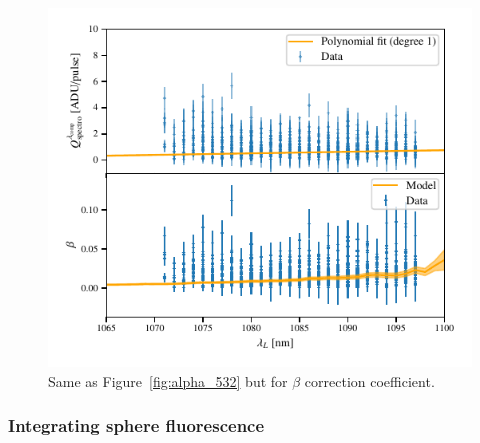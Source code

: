 \begin{figure}[h]
    \centering
    \includegraphics[width=\columnwidth]{fig/beta_532_qswMAX.pdf}
    \caption{Same as Figure~\ref{fig:alpha_532} but for $\beta$ correction coefficient.}
    \label{fig:beta}
\end{figure}


\subsubsection{Integrating sphere fluorescence}\label{sec:fluorescence}


